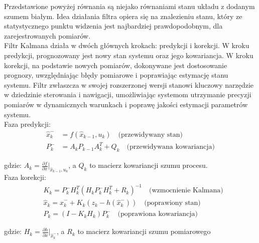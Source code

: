 Przedstawione powyżej równania są niejako równaniami stanu układu z dodanym szumem białym. Idea działania filtra opiera się na znalezieniu stanu, który ze statystycznego punktu widzenia jest najbardziej prawdopodobnym, dla zarejestrowanych pomiarów.\\

Filtr Kalmana działa w dwóch głównych krokach: predykcji i korekcji. W kroku predykcji, prognozowany jest nowy stan systemu oraz jego kowariancja. W kroku korekcji, na podstawie nowych pomiarów, dokonywane jest dostosowanie prognozy, uwzględniając błędy pomiarowe i poprawiając estymację stanu systemu. Filtr zwłaszcza w swojej rozszerzonej wersji stanowi kluczowy narzędzie w dziedzinie sterowania i nawigacji, umożliwiając systemom utrzymanie precyzji pomiarów w dynamicznych warunkach i poprawę jakości estymacji parametrów systemu.\\

Faza predykcji:
\[
\begin{aligned}
  \hat{x}_k^- & = f(\hat{x}_{k-1}, u_k) \quad \text{(przewidywany stan)} \\
  P_k^- & = A_k P_{k-1} A_k^T + Q_k \quad \text{(przewidywana kowariancja)}
\end{aligned}
\]

gdzie: $A_k = \frac{\partial f}{\partial x}\Bigr|_{\hat{x}_{k-1}, u_k}$, a $Q_k$ to macierz kowariancji szumu procesu.\\

Faza korekcji:
\[
\begin{aligned}
  &K_k = P_k^- H_k^T (H_k P_k^- H_k^T + R_k)^{-1} \quad \text{(wzmocnienie Kalmana)} \\
  &\hat{x}_k = \hat{x}_k^- + K_k(z_k - h(\hat{x}_k^-)) \quad \text{(poprawiony stan)} \\
  &P_k = (I - K_k H_k) P_k^- \quad \text{(poprawiona kowariancja)}
\end{aligned}
\]

gdzie: $H_k = \frac{\partial h}{\partial x}\Bigr|_{\hat{x}_k^-}$, a $R_k$ to macierz kowariancji szumu pomiarowego
